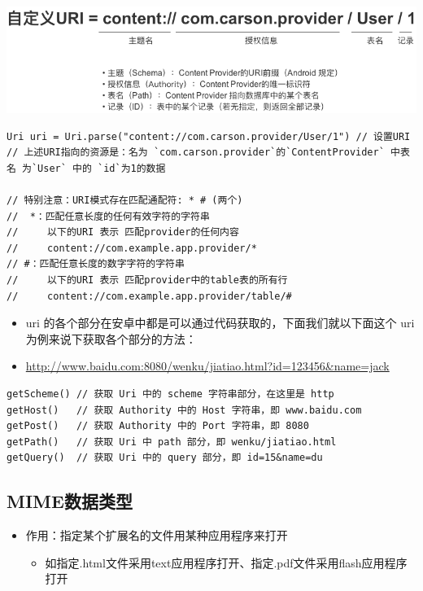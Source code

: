 \documentclass[9pt, b5paper]{article}
\begin{document}
\includegraphics[width=.9\linewidth]{./pic/uri.png}
\begin{verbatim}
Uri uri = Uri.parse("content://com.carson.provider/User/1") // 设置URI
// 上述URI指向的资源是：名为 `com.carson.provider`的`ContentProvider` 中表名 为`User` 中的 `id`为1的数据

// 特别注意：URI模式存在匹配通配符: * # (两个)
//  *：匹配任意长度的任何有效字符的字符串
//     以下的URI 表示 匹配provider的任何内容
//     content://com.example.app.provider/* 
// #：匹配任意长度的数字字符的字符串
//     以下的URI 表示 匹配provider中的table表的所有行
//     content://com.example.app.provider/table/#
\end{verbatim}
\begin{itemize}
\item uri 的各个部分在安卓中都是可以通过代码获取的，下面我们就以下面这个 uri 为例来说下获取各个部分的方法：
\item \url{http://www.baidu.com:8080/wenku/jiatiao.html?id=123456&name=jack}
\end{itemize}
\begin{verbatim}
getScheme() // 获取 Uri 中的 scheme 字符串部分，在这里是 http
getHost()   // 获取 Authority 中的 Host 字符串，即 www.baidu.com
getPost()   // 获取 Authority 中的 Port 字符串，即 8080
getPath()   // 获取 Uri 中 path 部分，即 wenku/jiatiao.html
getQuery()  // 获取 Uri 中的 query 部分，即 id=15&name=du
\end{verbatim}

\subsection{MIME数据类型}
\label{sec-1-2}
\begin{itemize}
\item 作用：指定某个扩展名的文件用某种应用程序来打开
\begin{itemize}
\item 如指定.html文件采用text应用程序打开、指定.pdf文件采用flash应用程序打开
\end{itemize}
\end{itemize}
\end{document}
